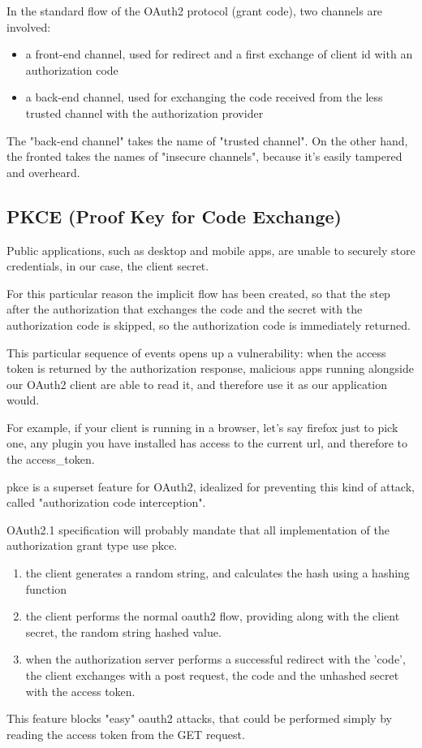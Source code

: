 In the standard flow of the OAuth2 protocol (grant code), two channels are
involved:
\begin{itemize}
    \item a front-end channel, used for redirect and a first exchange of client
        id with an authorization code
    \item a back-end channel, used for exchanging the code received from the
        less trusted channel with the authorization provider
\end{itemize}

The "back-end channel" takes the name of "trusted channel". On the other hand,
the fronted takes the names of "insecure channels", because it's easily tampered
and overheard.

\subsection{PKCE (Proof Key for Code Exchange)}
\label{pkce}
Public applications, such as desktop and mobile apps, are unable to securely
store credentials, in our case, the client secret.

For this particular reason the implicit flow has been created, so
that the step after the authorization that exchanges the code and the secret
with the authorization code is skipped, so the authorization code is immediately
returned.

This particular sequence of events opens up a vulnerability:
when the access token is returned by the authorization response, malicious apps
running alongside our OAuth2 client are able to read it, and therefore use it as
our application would.

For example, if your client is running in a browser, let's say firefox just to
pick one, any plugin you have installed has access to the current url, and
therefore to the access\_token.

\ac{pkce} is a superset feature for OAuth2, idealized for preventing this kind of
attack, called "authorization code interception".

OAuth2.1 specification will probably mandate that all implementation of the authorization
grant type use \ac{pkce}.

\begin{enumerate}
    \item the client generates a random string, and calculates the hash using a
        hashing function
    \item the client performs the normal oauth2 flow, providing along with the
        client secret, the random string hashed value.
    \item when the authorization server performs a successful redirect with the
        'code', the client exchanges with a post request, the code and the
        unhashed secret with the access token.
\end{enumerate}

This feature blocks "easy" oauth2 attacks, that could be performed simply by
reading the access token from the GET request.

